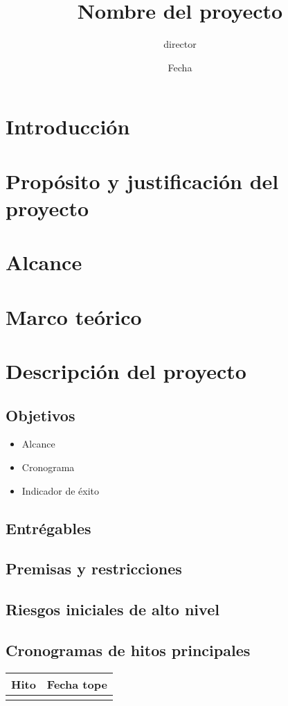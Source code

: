 \documentclass[hoptionsi]{acmart}
\title{Nombre del proyecto}
\author{director }
\date{Fecha}
\begin{document}
\maketitle

\section{Introducción}
\section{Propósito y justificación del proyecto}
\section{Alcance}
\section{Marco teórico}
\section{Descripción del proyecto}
\subsection{Objetivos}
\begin{itemize}
    \item Alcance
    \item Cronograma 
    \item Indicador de éxito
\end{itemize}
\subsection{Entrégables}
\subsection{Premisas y restricciones}
\subsection{Riesgos iniciales de alto nivel}
\subsection{Cronogramas de hitos principales}

\begin{table}[h]
\begin{tabular}{|l|l|}
\hline
\textbf{Hito} & \textbf{Fecha tope} \\ \hline
              &                     \\ \hline
\end{tabular}
\end{table}
\end{document}
